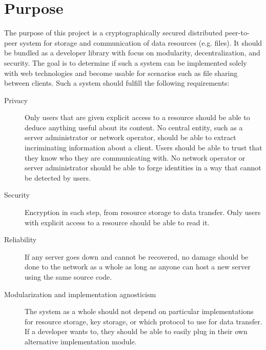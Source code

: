 \section{Purpose}\label{sec:purpose}

The purpose of this project is a cryptographically secured distributed peer-to-peer system for storage and communication of data resources (e.g. files). It should be bundled as a developer library with focus on modularity, decentralization, and security. The goal is to determine if such a system can be implemented solely with web technologies and become usable for scenarios such as file sharing between clients.
Such a system should fulfill the following requirements:

\begin{description}
  \item[Privacy] Only users that are given explicit access to a resource should be able to deduce anything useful about its content. No central entity, such as a server administrator or network operator, should be able to extract incriminating information about a client. Users should be able to trust that they know who they are communicating with. No network operator or server administrator should be able to forge identities in a way that cannot be detected by users.

\item[Security] Encryption in each step, from resource storage to data transfer. Only users with explicit access to a resource should be able to read it.

\item[Reliability] If any server goes down and cannot be recovered, no damage should be done to the network as a whole as long as anyone can host a new server using the same source code.

\item[Modularization and implementation agnosticism] The system as a whole should not depend on particular implementations for resource storage, key storage, or which protocol to use for data transfer. If a developer wants to, they should be able to easily plug in their own alternative implementation module.

\end{description}
